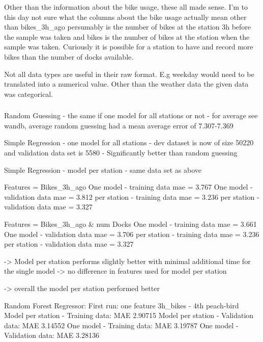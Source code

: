 \documentclass[a4paper]{article}
\begin{document}
    Other than the information about the bike usage, these all made sense. I'm to this day not sure what the columns
    about the bike usage actually mean other than bikes\_3h\_ago persumably is the number of bikes at the station 3h
    before the sample was taken and bikes is the number of bikes at the station when the sample was taken. Curiously it
    is possible for a station to have and record more bikes than the number of docks available.

    Not all data types are useful in their raw format. E.g weekday would need to be translated into a numerical value.
    Other than the weather data the given data was categorical.

    \subsubsection*{}

    Random Guessing - the same if one model for all stations or not
    - for average see wandb, average random guessing had a mean average error of 7.307-7.369

    Simple Regression - one model for all stations
    - dev dataset is now of size 50220 and validation data set is 5580
    - Significantly better than random guessing

    Simple Regression - model per station
    - same data set as above

    Features = Bikes\_3h\_ago
    One model - training data mae = 3.767
    One model - validation data mae = 3.812
    per station - training data mae = 3.236
    per station - validation data mae = 3.327

    Features = Bikes\_3h\_ago & num Docks
    One model - training data mae = 3.661
    One model - validation data mae = 3.706
    per station - training data mae = 3.236
    per station - validation data mae = 3.327

    -> Model per station performs slightly better with minimal additional time for the single model
    -> no difference in features used for model per station

    -> overall the model per station performed better

    Random Forest Regressor:
    First run: one feature 3h\_bikes - 4th peach-bird
    Model per station - Training data: MAE 2.90715
    Model per station - Validation data: MAE 3.14552
    One model - Training data: MAE 3.19787
    One model - Validation data: MAE 3.28136
\end{document}
